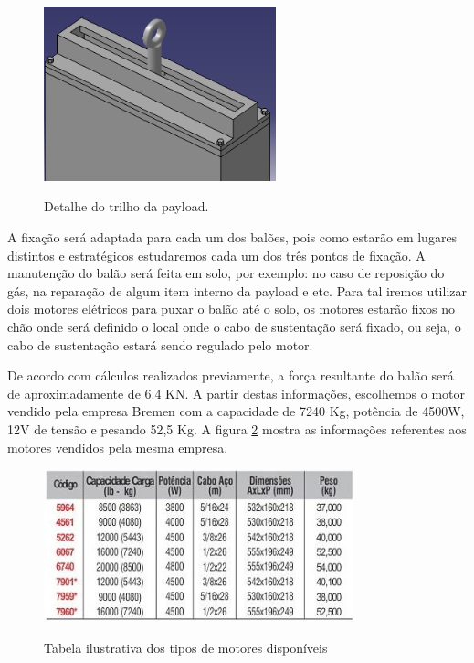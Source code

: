 	\begin{figure}[htp]
		\centering
		\caption{Detalhe do trilho da payload.}
		\includegraphics[width=0.6\textwidth]{figuras/catiadafixacao}
		\label{img:catia2}
	\end{figure}

A fixação será adaptada para cada um dos balões, pois como estarão em lugares distintos e estratégicos estudaremos cada um dos três pontos de fixação. A manutenção do balão será feita em solo, por exemplo: no caso de reposição do gás, na reparação de algum item interno da payload e etc. Para tal iremos utilizar dois motores elétricos para puxar o balão até o solo, os motores estarão fixos no chão onde será definido o local onde o cabo de sustentação será fixado, ou seja, o cabo de sustentação estará sendo regulado pelo motor.

De acordo com cálculos realizados previamente, a força resultante do balão será de aproximadamente de 6.4 KN. A partir destas informações, escolhemos o motor vendido pela empresa Bremen com a capacidade de 7240 Kg, potência de 4500W, 12V de tensão e pesando 52,5 Kg. A figura \ref{img:tabelamotor} mostra as informações referentes aos motores vendidos pela mesma empresa.

\begin{figure}[htp]
	\centering
	\caption[Tabela ilustrativa dos tipos de motores disponíveis]{Tabela ilustrativa dos tipos de motores disponíveis~\cite{bremem}}
	\includegraphics[width=0.8\textwidth]{figuras/tabelamotor}
	\label{img:tabelamotor}
\end{figure}

